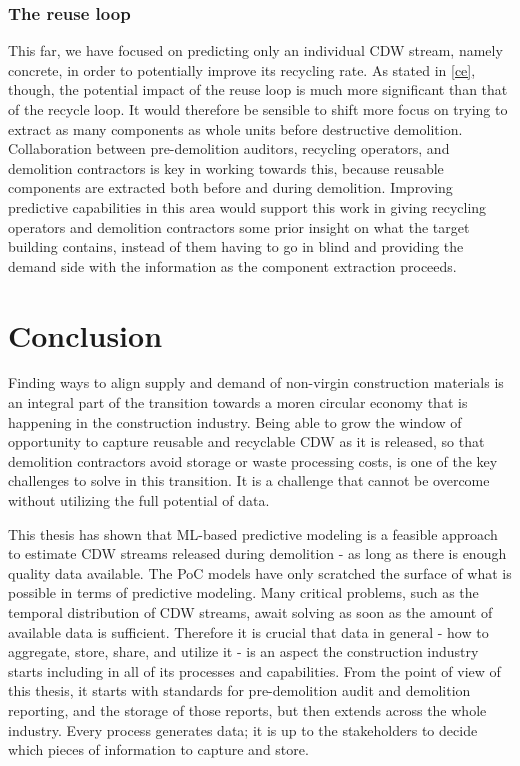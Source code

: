 \documentclass[english, 12pt, a4paper, sci, utf8, a-2b, online]{aaltothesis}
\begin{document}
\subsubsection{The reuse loop}

This far, we have focused on predicting only an individual CDW stream, namely concrete, in order to potentially improve its recycling rate. As stated in \ref{ce}, though, the potential impact of
the reuse loop is much more significant than that of the recycle loop. It would therefore be sensible to shift more focus on trying to extract as many components as whole units before destructive
demolition. Collaboration between pre-demolition auditors, recycling operators, and demolition contractors is key in working towards this, because reusable components are extracted both before
and during demolition. Improving predictive capabilities in this area would support this work in giving recycling operators and demolition contractors some prior insight on what the target
building contains, instead of them having to go in blind and providing the demand side with the information as the component extraction proceeds.

\clearpage

\section{Conclusion} \label{conclusion}

Finding ways to align supply and demand of non-virgin construction materials is an integral part of the transition towards a moren circular economy that is happening in the construction industry.
Being able to grow the window of opportunity to capture reusable and recyclable CDW as it is released, so that demolition contractors avoid storage or waste processing costs, is one of the key
challenges to solve in this transition. It is a challenge that cannot be overcome without utilizing the full potential of data.

This thesis has shown that ML-based predictive modeling is a feasible approach to estimate CDW streams released during demolition - as long as there is enough quality data available. The PoC models
have only scratched the surface of what is possible in terms of predictive modeling. Many critical problems, such as the temporal distribution of CDW streams, await solving as soon as the amount
of available data is sufficient. Therefore it is crucial that data in general - how to aggregate, store, share, and utilize it - is an aspect the construction industry starts including in all of
its processes and capabilities. From the point of view of this thesis, it starts with standards for pre-demolition audit and demolition reporting, and the storage of those reports, but then extends
across the whole industry. Every process generates data; it is up to the stakeholders to decide which pieces of information to capture and store.
\end{document}
